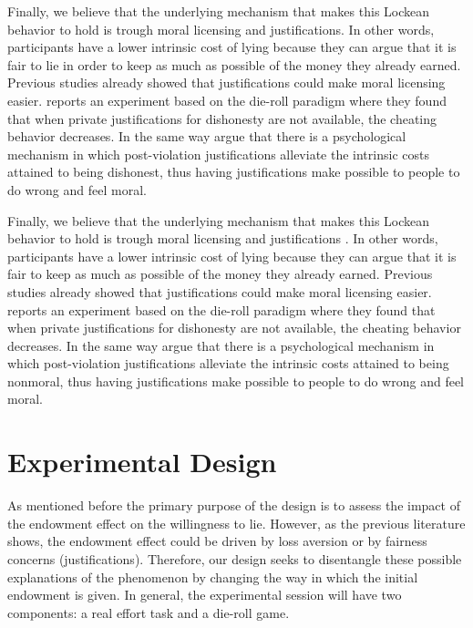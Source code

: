 \documentclass[12pt,final]{article}
\begin{document}
Finally, we believe that the underlying mechanism that makes this Lockean behavior to hold is trough moral licensing and justifications. In other words, participants have a lower intrinsic cost of lying because they can argue that it is fair to lie in order to keep as much as possible of the money they already earned. Previous studies already showed that justifications could make moral licensing easier.  \citet{Shalvi2012} reports an experiment based on the die-roll paradigm where they found that when private justifications for dishonesty are not available, the cheating behavior decreases. In the same way \citet{Shalvi2015} argue that there is a psychological mechanism in which post-violation justifications alleviate the intrinsic costs attained to being dishonest, thus having justifications make possible to people to do wrong and feel moral. 

Finally, we believe that the underlying mechanism that makes this Lockean behavior to hold is trough moral licensing \citep{Clot2014} and justifications \citep{Batson1997}. In other words, participants have a lower intrinsic cost of lying because they can argue that it is fair to keep as much as possible of the money they already earned. Previous studies already showed that justifications could make moral licensing easier.  \citet{Shalvi2012} reports an experiment based on the die-roll paradigm where they found that when private justifications for dishonesty are not available, the cheating behavior decreases. In the same way \citet{Shalvi2015} argue that there is a psychological mechanism in which post-violation justifications alleviate the intrinsic costs attained to being nonmoral, thus having justifications make possible to people to do wrong and feel moral. 

\section{Experimental Design}\label{sec:design}

As mentioned before the primary purpose of the design is to assess the impact of the endowment effect on the willingness to lie.  However, as the previous literature shows, the endowment effect could be driven by loss aversion or by fairness concerns (justifications). Therefore, our design seeks to disentangle these possible explanations of the phenomenon by changing the way in which the initial endowment is given. In general, the experimental session will have two components: a real effort task and a die-roll game. 
\end{document}
